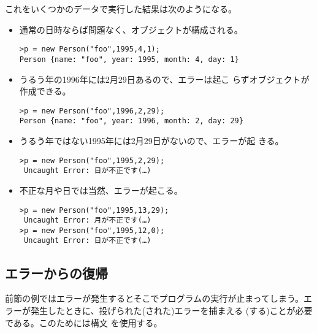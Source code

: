 これをいくつかのデータで実行した結果は次のようになる。
\begin{itemize}
 \item 通常の日時ならば問題なく、オブジェクトが構成される。
\begin{Verbatim}
>p = new Person("foo",1995,4,1);
Person {name: "foo", year: 1995, month: 4, day: 1}
\end{Verbatim}
 \item うるう年の1996年には2月29日あるので、エラーは起こ
			 らずオブジェクトが作成できる。
\begin{Verbatim}
>p = new Person("foo",1996,2,29);
Person {name: "foo", year: 1996, month: 2, day: 29}
\end{Verbatim}
 \item うるう年ではない1995年には2月29日がないので、エラーが起
			 きる。
\begin{Verbatim}
>p = new Person("foo",1995,2,29);
 Uncaught Error: 日が不正です(…)
\end{Verbatim}
 \item 不正な月や日では当然、エラーが起こる。
\begin{Verbatim}
>p = new Person("foo",1995,13,29);
 Uncaught Error: 月が不正です(…)
>p = new Person("foo",1995,12,0);
 Uncaught Error: 日が不正です(…)
\end{Verbatim}
\end{itemize}


\subsection{エラーからの復帰}
前節の例ではエラーが発生するとそこでプログラムの実行が止まってしまう。エ
ラーが発生したときに、投げられた(された)エラーを捕まえる
(する)ことが必要である。このためには構文
を使用する。

